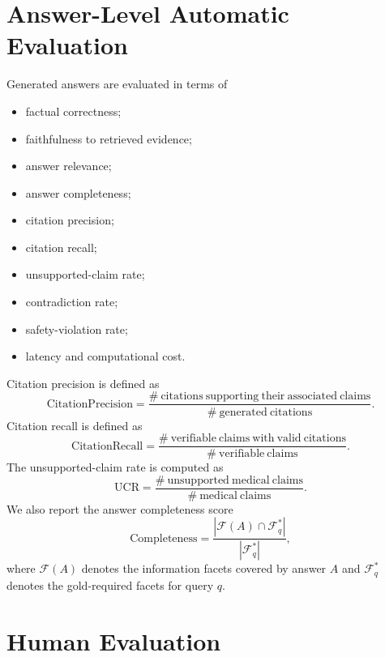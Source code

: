 \documentclass{article}
\begin{document}
\section{Answer-Level Automatic Evaluation}

Generated answers are evaluated in terms of
\begin{itemize}
    \item factual correctness;
    \item faithfulness to retrieved evidence;
    \item answer relevance;
    \item answer completeness;
    \item citation precision;
    \item citation recall;
    \item unsupported-claim rate;
    \item contradiction rate;
    \item safety-violation rate;
    \item latency and computational cost.
\end{itemize}

Citation precision is defined as
\begin{equation}
    \mathrm{CitationPrecision}
    =
    \frac{
    \#\mathrm{\ citations\ supporting\ their\ associated\ claims}
    }{
    \#\mathrm{\ generated\ citations}
    }.
\end{equation}
Citation recall is defined as
\begin{equation}
    \mathrm{CitationRecall}
    =
    \frac{
    \#\mathrm{\ verifiable\ claims\ with\ valid\ citations}
    }{
    \#\mathrm{\ verifiable\ claims}
    }.
\end{equation}
The unsupported-claim rate is computed as
\begin{equation}
    \mathrm{UCR}
    =
    \frac{
    \#\mathrm{\ unsupported\ medical\ claims}
    }{
    \#\mathrm{\ medical\ claims}
    }.
\end{equation}
We also report the answer completeness score
\begin{equation}
    \mathrm{Completeness}
    =
    \frac{
    |\mathcal{F}(A) \cap \mathcal{F}_q^{*}|
    }{
    |\mathcal{F}_q^{*}|
    },
\end{equation}
where $\mathcal{F}(A)$ denotes the information facets covered by answer $A$ and $\mathcal{F}_q^{*}$ denotes the gold-required facets for query $q$.

\section{Human Evaluation}
\end{document}
